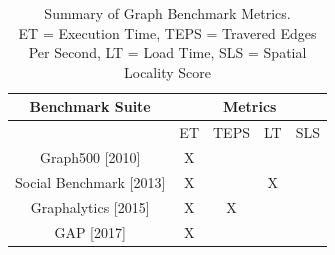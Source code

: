 \documentclass[letterpaper, 10pt]{article}
\begin{document}
\begin{multicols}{2}
{        \scriptsize
        \begin{table}[h!]
        \centering
          \begin{tabular}{|c|c|c|c|c|}
            \hline
            {Benchmark Suite} & \multicolumn{4}{|c|}{Metrics} \\
            \hline
                                                      & ET & TEPS & LT & SLS\\
            \hline
             Graph500 [2010]\cite{Murphy2010}         &  X &      &    &     \\
             Social Benchmark [2013]\cite{Angles2013} &  X &      & X  &     \\
             Graphalytics [2015]\cite{Capota2015}     &  X &   X  &    &     \\
             GAP [2017]\cite{Beamer2017}              &  X &      &    &     \\
            \hline
          \end{tabular}
          \caption{Summary of Graph Benchmark Metrics.\\ ET = Execution Time, TEPS = Travered Edges Per Second, LT = Load Time, SLS = Spatial Locality Score}
          \label{table:graphMetrics}
        \end{table}
        \normalsize

}
\end{multicols}
\end{document}
